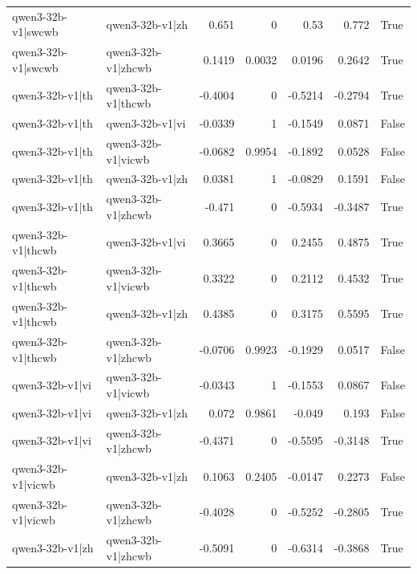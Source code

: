\begin{table}
\begin{tabular}{l l r r r r l}
qwen3-32b-v1|swcwb & qwen3-32b-v1|zh & 0.651 & 0 & 0.53 & 0.772 & True \\
qwen3-32b-v1|swcwb & qwen3-32b-v1|zhcwb & 0.1419 & 0.0032 & 0.0196 & 0.2642 & True \\
qwen3-32b-v1|th & qwen3-32b-v1|thcwb & -0.4004 & 0 & -0.5214 & -0.2794 & True \\
qwen3-32b-v1|th & qwen3-32b-v1|vi & -0.0339 & 1 & -0.1549 & 0.0871 & False \\
qwen3-32b-v1|th & qwen3-32b-v1|vicwb & -0.0682 & 0.9954 & -0.1892 & 0.0528 & False \\
qwen3-32b-v1|th & qwen3-32b-v1|zh & 0.0381 & 1 & -0.0829 & 0.1591 & False \\
qwen3-32b-v1|th & qwen3-32b-v1|zhcwb & -0.471 & 0 & -0.5934 & -0.3487 & True \\
qwen3-32b-v1|thcwb & qwen3-32b-v1|vi & 0.3665 & 0 & 0.2455 & 0.4875 & True \\
qwen3-32b-v1|thcwb & qwen3-32b-v1|vicwb & 0.3322 & 0 & 0.2112 & 0.4532 & True \\
qwen3-32b-v1|thcwb & qwen3-32b-v1|zh & 0.4385 & 0 & 0.3175 & 0.5595 & True \\
qwen3-32b-v1|thcwb & qwen3-32b-v1|zhcwb & -0.0706 & 0.9923 & -0.1929 & 0.0517 & False \\
qwen3-32b-v1|vi & qwen3-32b-v1|vicwb & -0.0343 & 1 & -0.1553 & 0.0867 & False \\
qwen3-32b-v1|vi & qwen3-32b-v1|zh & 0.072 & 0.9861 & -0.049 & 0.193 & False \\
qwen3-32b-v1|vi & qwen3-32b-v1|zhcwb & -0.4371 & 0 & -0.5595 & -0.3148 & True \\
qwen3-32b-v1|vicwb & qwen3-32b-v1|zh & 0.1063 & 0.2405 & -0.0147 & 0.2273 & False \\
qwen3-32b-v1|vicwb & qwen3-32b-v1|zhcwb & -0.4028 & 0 & -0.5252 & -0.2805 & True \\
qwen3-32b-v1|zh & qwen3-32b-v1|zhcwb & -0.5091 & 0 & -0.6314 & -0.3868 & True \\
\bottomrule
\end{tabular}
\end{table}

